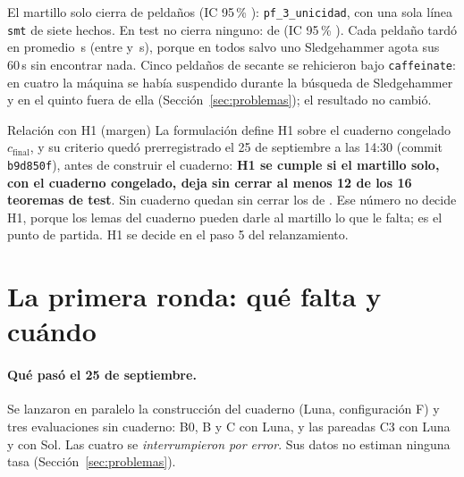 \documentclass[11pt]{article}
\theoremstyle{remark}
\newcommand{\fuente}[1]{\par\smallskip{\raggedright\footnotesize\textit{Fuente:} #1\par}}
\begin{document}
\begin{table}[H]
\centering\small

\caption{Línea base A sin cuaderno, por dificultad: cerrados por el martillo sobre peldaños.}\label{tab:lineabase-dif}
\fuente{Ídem.}
\end{table}

El martillo solo cierra \AtodosX{} de \AtodosN{} peldaños (IC 95\,\% \AtodosIC): \texttt{pf\_3\_unicidad}, con una sola línea \texttt{smt} de siete hechos. En test no cierra ninguno: \AtestX{} de \AtestN{} (IC 95\,\% \AtestIC). Cada peldaño tardó en promedio \Amedia\,s (entre \Amin{} y \Amax\,s), porque en todos salvo uno Sledgehammer agota sus 60\,s sin encontrar nada. Cinco peldaños de secante se rehicieron bajo \texttt{caffeinate}: en cuatro la máquina se había suspendido durante la búsqueda de Sledgehammer y en el quinto fuera de ella (Sección~\ref{sec:problemas}); el resultado no cambió.

\begin{recuadro}{Relación con H1 (margen)}
La formulación define H1 sobre el cuaderno congelado $c_{\mathrm{final}}$, y su criterio quedó prerregistrado el 25 de septiembre a las 14:30 (commit \texttt{b9d850f}), antes de construir el cuaderno: \textbf{H1 se cumple si el martillo solo, con el cuaderno congelado, deja sin cerrar al menos 12 de los 16 teoremas de test}. Sin cuaderno quedan sin cerrar los \AtestNoCerrados{} de \AtestN. Ese número no decide H1, porque los lemas del cuaderno pueden darle al martillo lo que le falta; es el punto de partida. H1 se decide en el paso 5 del relanzamiento.
\end{recuadro}

\section{La primera ronda: qué falta y cuándo}\label{sec:ronda}

\paragraph{Qué pasó el 25 de septiembre.} Se lanzaron en paralelo la construcción del cuaderno (Luna, configuración F) y tres evaluaciones sin cuaderno: B0, B y C con Luna, y las pareadas C3 con Luna y con Sol. Las cuatro se \emph{interrumpieron por error}. Sus datos no estiman ninguna tasa (Sección~\ref{sec:problemas}).
\end{document}
